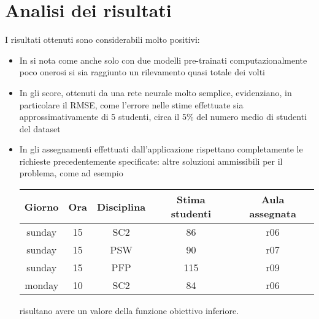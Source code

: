 \newpage

\section{Analisi dei risultati}

I risultati ottenuti sono considerabili molto positivi:

\begin{itemize}
    \item In \textbf{} si nota come anche solo con due modelli pre-trainati
        computazionalmente poco onerosi si sia raggiunto un rilevamento quasi totale dei volti
    \item In \textbf{} gli score, ottenuti da una rete neurale molto semplice,
        evidenziano, in particolare il RMSE, come l'errore nelle stime effettuate sia approssimativamente 
        di 5 studenti, circa il 5\% del numero medio di studenti del dataset
    \item In \textbf{} gli assegnamenti effettuati dall'applicazione rispettano
        completamente le richieste precedentemente specificate: altre soluzioni ammissibili per il problema,
        come ad esempio 

        \begin{table}[h]
            \begin{small}
                \begin{center}
                    \begin{tabular}[c]{c|c|c|c|c}
                        Giorno & Ora & Disciplina & Stima studenti & Aula assegnata \\
                        \hline
                        sunday & 15 & SC2 & 86 & r06 \\
                        sunday & 15 & PSW & 90 & r07 \\
                        sunday & 15 & PFP & 115 & r09 \\
                        monday & 10 & SC2 & 84 & r06
                    \end{tabular}
                \end{center}
            \end{small}
        \end{table}

        risultano avere un valore della funzione obiettivo inferiore.

    \end{itemize}
